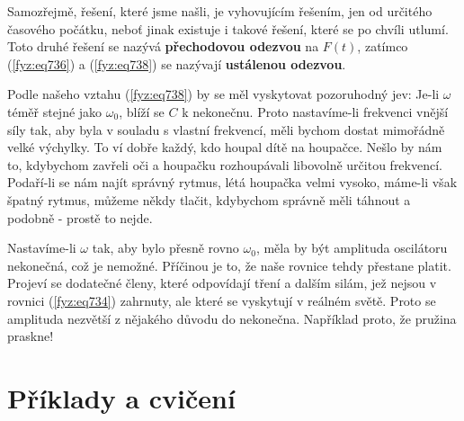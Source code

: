     Samozřejmě, řešení, které jsme našli, je vyhovujícím řešením, jen od určitého časového počátku,
    neboť jinak existuje i takové řešení, které se po chvíli utlumí. Toto druhé řešení se nazývá
    \textbf{přechodovou odezvou} na \(F(t)\), zatímco (\ref{fyz:eq736}) a (\ref{fyz:eq738}) se
    nazývají \textbf{ustálenou odezvou}.

    Podle našeho vztahu (\ref{fyz:eq738}) by se měl vyskytovat pozoruhodný jev: Je-li \(\omega\)
    téměř stejné jako \(\omega_0\), blíží se \(C\) k nekonečnu. Proto nastavíme-li frekvenci vnější
    síly tak, aby byla v souladu s vlastní frekvencí, měli bychom dostat mimořádně velké výchylky.
    To ví dobře každý, kdo houpal dítě na houpačce. Nešlo by nám to, kdybychom zavřeli oči a
    houpačku rozhoupávali libovolně určitou frekvencí. Podaří-li se nám najít správný rytmus, létá
    houpačka velmi vysoko, máme-li však špatný rytmus, můžeme někdy tlačit, kdybychom správně měli
    táhnout a podobně - prostě to nejde.

    Nastavíme-li \(\omega\) tak, aby bylo přesně rovno \(\omega_0\), měla by být amplituda
    oscilátoru nekonečná, což je nemožné. Příčinou je to, že naše rovnice tehdy přestane platit.
    Projeví se dodatečné členy, které odpovídají tření a dalším silám, jež nejsou v rovnici
    (\ref{fyz:eq734}) zahrnuty, ale které se vyskytují v reálném světě. Proto se amplituda nezvětší
    z nějakého důvodu do nekonečna. Například proto, že pružina praskne!

  \section{Příklady a cvičení}\label{fyz:IchapXXIsecVI}

